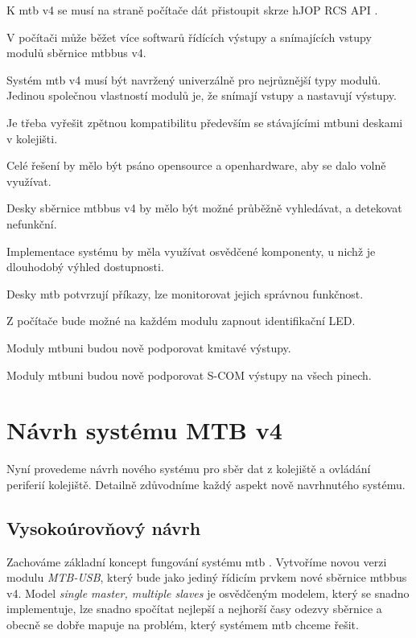 \begin{compactenum}
\item K \gls{mtb} v4 se musí na straně počítače dát přistoupit skrze hJOP RCS
	API \cite{}.
\item V počítači může běžet více softwarů řídících výstupy a snímajících vstupy
	modulů sběrnice \gls{mtbbus} v4.
\item Systém \gls{mtb} v4 musí být navržený univerzálně pro nejrůznější typy
	modulů. Jedinou společnou vlastností modulů je, že snímají vstupy a nastavují
	výstupy.
\item Je třeba vyřešit zpětnou kompatibilitu především se stávajícími
	\gls{mtbuni} deskami v kolejišti.
\item Celé řešení by mělo být psáno opensource a openhardware, aby se dalo volně
	využívat.
\item Desky sběrnice \gls{mtbbus} v4 by mělo být možné průběžně vyhledávat,
	a detekovat nefunkční.
\item Implementace systému by měla využívat osvědčené komponenty, u nichž
	je dlouhodobý výhled dostupnosti.
\item Desky \gls{mtb} potvrzují příkazy, lze monitorovat jejich správnou funkčnost.
\item Z počítače bude možné na každém modulu zapnout identifikační LED.
\item Moduly \gls{mtbuni} budou nově podporovat kmitavé výstupy.
\item Moduly \gls{mtbuni} budou nově podporovat S-COM výstupy na všech pinech.
\end{compactenum}


\section{Návrh systému MTB v4}

Nyní provedeme návrh nového systému pro sběr dat z kolejiště a ovládání
periferií kolejiště. Detailně zdůvodníme každý aspekt nově navrhnutého systému.

\subsection{Vysokoúrovňový návrh}

Zachováme základní koncept fungování systému \gls{mtb} . Vytvoříme novou verzi modulu \textit{MTB-USB}, který bude
jako jediný řídicím prvkem nové sběrnice \gls{mtbbus} v4. Model \textit{single
master, multiple slaves} je osvědčeným modelem, který se snadno implementuje,
lze snadno spočítat nejlepší a nejhorší časy odezvy sběrnice a obecně se dobře
mapuje na problém, který systémem \gls{mtb} chceme řešit.

